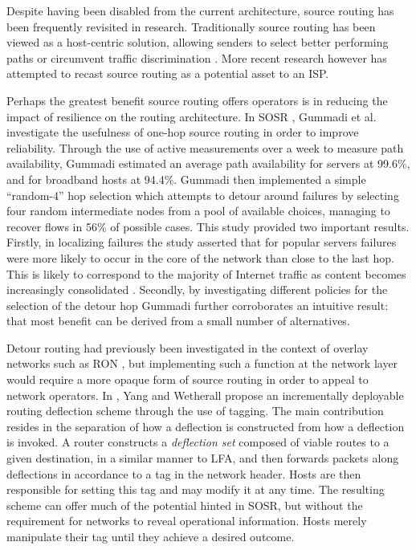 Despite having been disabled from the current architecture, source routing has been frequently revisited in research.
Traditionally source routing has been viewed as a host-centric solution, allowing senders to select better performing paths or circumvent traffic discrimination \cite{Mahajan:2008p407,Dischinger:2010p157}.
More recent research however has attempted to recast source routing as a potential asset to an \ac{ISP}.

Perhaps the greatest benefit source routing offers operators is in reducing the impact of resilience on the routing architecture.
In \ac{SOSR} \cite{Gummadi:2004p131}, Gummadi et al. investigate the usefulness of one-hop source routing in order to improve reliability.
Through the use of active measurements over a week to measure path availability, Gummadi estimated an average path availability for servers at 99.6\%, and for broadband hosts at 94.4\%.
Gummadi then implemented a simple ``random-4'' hop selection which attempts to detour around failures by selecting four random intermediate nodes from a pool of available choices, managing to recover flows in 56\% of possible cases.
This study provided two important results.
Firstly, in localizing failures the study asserted that for popular servers failures were more likely to occur in the core of the network than close to the last hop.
This is likely to correspond to the majority of Internet traffic as content becomes increasingly consolidated \cite{Labovitz:2010p175}.
Secondly, by investigating different policies for the selection of the detour hop Gummadi further corroborates an intuitive result: that most benefit can be derived from a small number of alternatives.

Detour routing had previously been investigated in the context of overlay networks such as \ac{RON} \cite{Andersen:2002p530}, but implementing such a function at the network layer would require a more opaque form of source routing in order to appeal to network operators.
In \cite{Yang:2006p405}, Yang and Wetherall propose an incrementally deployable routing deflection scheme through the use of tagging.
The main contribution resides in the separation of how a deflection is constructed from how a deflection is invoked.
A router constructs a \emph{deflection set} composed of viable routes to a given destination, in a similar manner to \ac{LFA}, and then forwards packets along deflections in accordance to a tag in the network header.
Hosts are then responsible for setting this tag and may modify it at any time.
The resulting scheme can offer much of the potential hinted in \ac{SOSR}, but without the requirement for networks to reveal operational information.
Hosts merely manipulate their tag until they achieve a desired outcome.

